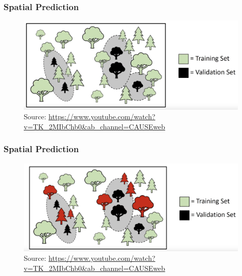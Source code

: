 \documentclass[
  shownotes,
  xcolor={svgnames},
  hyperref={colorlinks,citecolor=DarkBlue,linkcolor=andesred,urlcolor=DarkBlue}
  , aspectratio=169]{beamer}
\begin{document}
\begin{frame}[fragile]
\frametitle{Spatial Prediction}

\begin{figure}[H] \centering
            \captionsetup{justification=centering}
\includegraphics[scale=0.3]{figures/spatial_cross/fig08.png}
\\
\tiny
Source: \url{https://www.youtube.com/watch?v=TK_2MIbChb0&ab_channel=CAUSEweb}
 \end{figure}
\end{frame}

\begin{frame}[fragile]
\frametitle{Spatial Prediction}

\begin{figure}[H] \centering
            \captionsetup{justification=centering}
\includegraphics[scale=0.3]{figures/spatial_cross/fig09.png}
\\
\tiny
Source: \url{https://www.youtube.com/watch?v=TK_2MIbChb0&ab_channel=CAUSEweb}
 \end{figure}
\end{frame}
\end{document}
